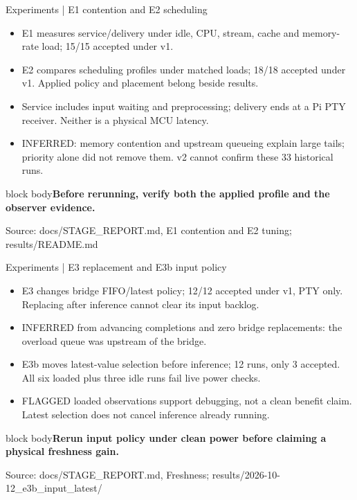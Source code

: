 \documentclass[aspectratio=169,12pt,t]{beamer}
\newcommand{\src}[1]{\par\vfill{\small\color{muted}Source: #1}}
\newcommand{\takeaway}[1]{\par\medskip\begin{beamercolorbox}[sep=2mm,wd=\linewidth]{block body}\color{navy}\textbf{#1}\end{beamercolorbox}}
\begin{document}
\begin{frame}{Experiments | E1 contention and E2 scheduling}
\begin{itemize}
\item E1 measures service/delivery under idle, CPU, stream, cache and memory-rate load; 15/15 accepted under v1.
\item E2 compares scheduling profiles under matched loads; 18/18 accepted under v1. Applied policy and placement belong beside results.
\item Service includes input waiting and preprocessing; delivery ends at a Pi PTY receiver. Neither is a physical MCU latency.
\item INFERRED: memory contention and upstream queueing explain large tails; priority alone did not remove them. v2 cannot confirm these 33 historical runs.
\end{itemize}
\takeaway{Before rerunning, verify both the applied profile and the observer evidence.}\src{docs/STAGE\_REPORT.md, E1 contention and E2 tuning; results/README.md}
\end{frame}
\begin{frame}{Experiments | E3 replacement and E3b input policy}
\begin{itemize}
\item E3 changes bridge FIFO/latest policy; 12/12 accepted under v1, PTY only. Replacing after inference cannot clear its input backlog.
\item INFERRED from advancing completions and zero bridge replacements: the overload queue was upstream of the bridge.
\item E3b moves latest-value selection before inference; 12 runs, only 3 accepted. All six loaded plus three idle runs fail live power checks.
\item FLAGGED loaded observations support debugging, not a clean benefit claim. Latest selection does not cancel inference already running.
\end{itemize}
\takeaway{Rerun input policy under clean power before claiming a physical freshness gain.}\src{docs/STAGE\_REPORT.md, Freshness; results/2026-10-12\_e3b\_input\_latest/}
\end{frame}
\end{document}
